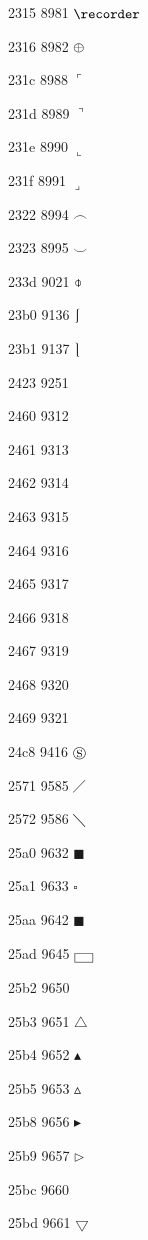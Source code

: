 \documentclass[11pt]{article}
\begin{document}
2315 8981 \ensuremath{\recorder}

2316 8982 \ensuremath{\mathchar"2208}

231c 8988 \ensuremath{\ulcorner}

231d 8989 \ensuremath{\urcorner}

231e 8990 \ensuremath{\llcorner}

231f 8991 \ensuremath{\lrcorner}

2322 8994 \ensuremath{\frown}

2323 8995 \ensuremath{\smile}

233d 9021 \ensuremath{\obar}

23b0 9136 \ensuremath{\lmoustache}

23b1 9137 \ensuremath{\rmoustache}

2423 9251 \textvisiblespace

2460 9312 

2461 9313 

2462 9314 

2463 9315 

2464 9316 

2465 9317 

2466 9318 

2467 9319 

2468 9320 

2469 9321 

24c8 9416 \ensuremath{\circledS}

2571 9585 \ensuremath{\diagup}

2572 9586 \ensuremath{\diagdown}

25a0 9632 \ensuremath{\blacksquare}

25a1 9633 \ensuremath{\square}

25aa 9642 \ensuremath{\blacksquare}

25ad 9645 \ensuremath{\fbox{~~}}

25b2 9650 

25b3 9651 \ensuremath{\bigtriangleup}

25b4 9652 \ensuremath{\blacktriangle}

25b5 9653 \ensuremath{\vartriangle}

25b8 9656 \ensuremath{\blacktriangleright}

25b9 9657 \ensuremath{\triangleright}

25bc 9660 

25bd 9661 \ensuremath{\bigtriangledown}
\end{document}
